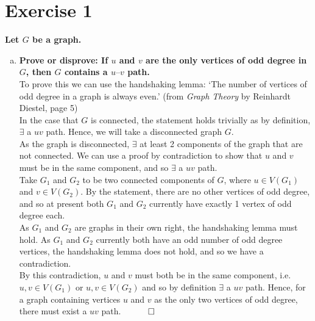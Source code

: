 \section*{Exercise 1}
\boldmath
\textbf{Let $G$ be a graph.}
\begin{enumerate}[a)]
    \item \textbf{Prove or disprove: If $u$ and $v$ are the only vertices of odd degree in $G$, then $G$ contains a $u–v$ path.} 
    \unboldmath
    \\
    \linebreak 
    To prove this we can use the handshaking lemma: ‘The number of vertices of odd degree in a graph is always even.’ (from \textit{Graph Theory} by Reinhardt Diestel, page 5)\\
    \linebreak 
    In the case that $G$ is connected, the statement holds trivially as by definition, $\exists$ a $uv$ path. Hence, we will take a disconnected graph $G$. \\
    \linebreak 
    As the graph is disconnected, $\exists $ at least 2 components of the graph that are not connected. We can use a proof by contradiction to show that $u$ and $v$ must be in the same component, and so $\exists$ a $uv$ path. \\
    \linebreak
    Take $G_1$ and $G_2$ to be two connected components of $G$, where $u \in V(G_1)$ and $v \in V(G_2)$. By the statement, there are no other vertices of odd degree, and so at present both $G_1$ and $G_2$ currently have exactly 1 vertex of odd degree each. \\
    \linebreak 
    As $G_1$ and $G_2$ are graphs in their own right, the handshaking lemma must hold. As $G_1$ and $G_2$ currently both have an odd number of odd degree vertices, the handshaking lemma does not hold, and so we have a contradiction. \\
    \linebreak 
    By this contradiction, $u$ and $v$ must both be in the same component, i.e. $u, v \in V(G_1)$ or $u, v \in V(G_2)$ and so by definition $\exists$ a $uv$ path. Hence, for a graph containing vertices $u$ and $v$ as the only two vertices of odd degree, there must exist a $uv$ path. $\hspace{10mm} \square$ \\

\end{enumerate}
